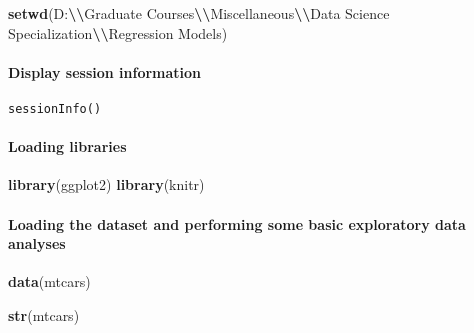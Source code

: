 \documentclass[
]{article}
\newenvironment{Shaded}{\begin{snugshade}}{\end{snugshade}}
\newcommand{\FunctionTok}[1]{\textcolor[rgb]{0.13,0.29,0.53}{\textbf{#1}}}
\newcommand{\NormalTok}[1]{#1}
\newcommand{\SpecialCharTok}[1]{\textcolor[rgb]{0.81,0.36,0.00}{\textbf{#1}}}
\newcommand{\StringTok}[1]{\textcolor[rgb]{0.31,0.60,0.02}{#1}}
\begin{document}
\begin{Shaded}
\begin{Highlighting}[]
\FunctionTok{setwd}\NormalTok{(}\StringTok{\textquotesingle{}D:}\SpecialCharTok{\textbackslash{}\textbackslash{}}\StringTok{Graduate Courses}\SpecialCharTok{\textbackslash{}\textbackslash{}}\StringTok{Miscellaneous}\SpecialCharTok{\textbackslash{}\textbackslash{}}\StringTok{Data Science Specialization}\SpecialCharTok{\textbackslash{}\textbackslash{}}\StringTok{Regression Models\textquotesingle{}}\NormalTok{)}
\end{Highlighting}
\end{Shaded}

\hypertarget{display-session-information}{%
\paragraph{Display session
information}\label{display-session-information}}

\begin{verbatim}
sessionInfo()
\end{verbatim}

\hypertarget{loading-libraries}{%
\paragraph{Loading libraries}\label{loading-libraries}}

\begin{Shaded}
\begin{Highlighting}[]
\FunctionTok{library}\NormalTok{(ggplot2)               }
\FunctionTok{library}\NormalTok{(knitr)}
\end{Highlighting}
\end{Shaded}

\hypertarget{loading-the-dataset-and-performing-some-basic-exploratory-data-analyses}{%
\paragraph{Loading the dataset and performing some basic exploratory
data
analyses}\label{loading-the-dataset-and-performing-some-basic-exploratory-data-analyses}}

\begin{Shaded}
\begin{Highlighting}[]
\FunctionTok{data}\NormalTok{(mtcars)}

\FunctionTok{str}\NormalTok{(mtcars)}
\end{Highlighting}
\end{Shaded}
\end{document}
